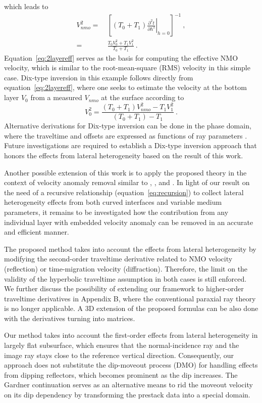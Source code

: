 which leads to
\begin{align}
\nonumber
    V^2_{nmo} =&~\left[ (T_0+T_1) \left.\frac{\partial^2 t}{\partial h^2 }\right\rvert_{h=0} \right]^{-1}~, \\
\label{eq:2layereff}
    =&~\frac{T_0V^2_0 + T_1V^2_1}{T_0+T_1}~.
\end{align}
Equation~\ref{eq:2layereff} serves as the basis for computing the effective NMO velocity, which is similar to the root-mean-square (RMS) velocity in this simple case. Dix-type inversion in this example follows directly from equation~\ref{eq:2layereff}, where one seeks to estimate the velocity at the bottom layer $V_0$ from a measured $V_{nmo}$ at the surface according to
\begin{equation}
    V^2_0 = \frac{(T_0+T_1)V^2_{nmo} - T_1 V^2_1}{(T_0+T_1) - T_1}~.
\end{equation}
Alternative derivations for Dix-type inversion can be done in the phase domain, where the traveltime and offsets are expressed as functions of ray parameters \cite[]{tsvankinbook,zoneinterval,korenravvetriclinic}.
Future investigations are required to establish a Dix-type inversion approach that honors the effects from lateral heterogeneity based on the result of this work.

Another possible extension of this work is to apply the proposed theory in the context of velocity anomaly removal similar to \cite{blias2009}, \cite{takanashitsvankin11}, and \cite{takanashitsvankin12}. In light of our result on the need of a recursive relationship (equation~\ref{eq:recursion}) to collect lateral heterogeneity effects from both curved interfaces and variable medium parameters, it remains to be investigated how the contribution from any individual layer with embedded velocity anomaly can be removed in an accurate and efficient manner.

The proposed method takes into account the effects from lateral heterogeneity by modifying the second-order traveltime derivative related to NMO velocity (reflection) or time-migration velocity (diffraction). Therefore, the limit on the validity of the hyperbolic traveltime assumption in both cases is still enforced. We further discuss the possibility of extending our framework to higher-order traveltime derivatives in Appendix B, where the conventional paraxial ray theory is no longer applicable. A 3D extension of the proposed formulas can be also done with the derivatives turning into matrices.

Our method takes into account the first-order effects from lateral heterogeneity in largely flat subsurface, which ensures that the normal-incidence ray and the image ray stays close to the reference vertical direction. Consequently, our approach does not substitute the dip-moveout process (DMO) for handling effects from dipping reflectors, which becomes prominent as the dip increases. The Gardner continuation \cite[]{gardner} serves as an alternative means to rid the moveout velocity on its dip dependency by transforming the prestack data into a special domain.

